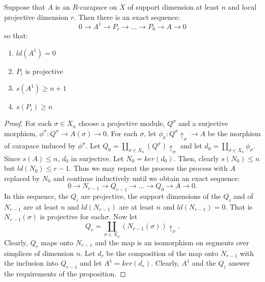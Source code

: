 \begin{secprop}\label{chap6-proposition-4.2}
Suppose that $A$ is an $R$-carapace on $X$ of support dimension at least $n$ and local projective dimension $r$. Then  there is an exact sequence:
\begin{equation*}\label{chap6-equation-4.3}
0 \rightarrow A^{1} \rightarrow P_{r}\rightarrow\ldots \rightarrow P_{0} \rightarrow A \rightarrow 0\tag{4.3}
\end{equation*}
so that:
    \begin{enumerate}[(1)]
    \item $ld(A^{1}) = 0$\label{chap6-equation-enum-1}
    \item $P_{i}$ is projective\label{chap6-equation-enum-2}
    \item $s(A^{1})\geq n+1$\label{chap6-equation-enum-3}
    \item $s(P_{i}) \geq n$\label{chap6-equation-enum-4}
    \end{enumerate}
\end{secprop}

\begin{proof}
For each $\sigma \in X_{n}$ choose a projective module, $Q^{\sigma}$ and a surjective morphism, $\phi^{\sigma} : Q^{\sigma} \rightarrow A(\sigma)\rightarrow 0$. For each $\sigma$, let $\phi_{\sigma} : Q^{\sigma}\uparrow_{\sigma} \rightarrow A$ be the morphism of carapace induced by $\phi^{\sigma}$. Let $Q_{0}= \coprod_{\sigma\in X_{n}}(Q^{\sigma})\uparrow_{\sigma}$ and let $d_{0}=\coprod_{\sigma \in X_{n}}\phi_{\sigma}$. Since $s(A)\leq n$, $d_{0}$ in surjective. Let $N_{0} =ker(d_{0})$. Then, clearly $s(N_{0}) \leq n$ but $ld(N_{0})\leq r-1$. Thus we may repeat the process the process with $A$ replaced by $N_{0}$ and continue inductively until we obtain an exact sequence:
$$
0 \rightarrow N_{r-1} \rightarrow Q_{r-1} \rightarrow\ldots \rightarrow Q_{0} \rightarrow A \rightarrow 0.
$$
In this sequence, the $Q_{i}$ are projective, the support dimensions of the $Q_{i}$ and of $N_{r-1}$ are at least $n$ and $ld(N_{r-1})$ are at least $n$ and $ld(N_{r-1})=0$. That is $N_{r-1}(\sigma)$ is projective for each\pageoriginale $\sigma$. Now let 
$$
Q_{r}=\coprod_{\sigma \in X_{n}}(N_{r-1}(\sigma))\uparrow_{\sigma}.
$$ 
Clearly, $Q_{r}$ maps onto $N_{r-1}$ and the map is an isomorphism on segments over simplices of dimension $n$. Let $d_{r}$ be the composition of the map onto $N_{r-1}$ with the inclusion into $Q_{r-1}$ and let $A^{1} =ker(d_{r})$. Clearly, $A^{1}$ and the $Q_{i}$ answer the requirements of the proposition.
\end{proof}

